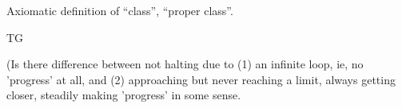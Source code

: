 Axiomatic definition of ``class'', ``proper class''.

\textsf{TG}


\cite{wiki:Finitist_set_theory}

\cite{wiki:Constructive_set_theory}

\setcounter{currentlevel}{\value{baseSectionLevel}}

(Is there difference between 
not halting due to (1) an infinite loop, ie,
no 'progress' at all,
and (2) approaching but never reaching a limit,
always getting closer, steadily making 'progress' in some sense.
